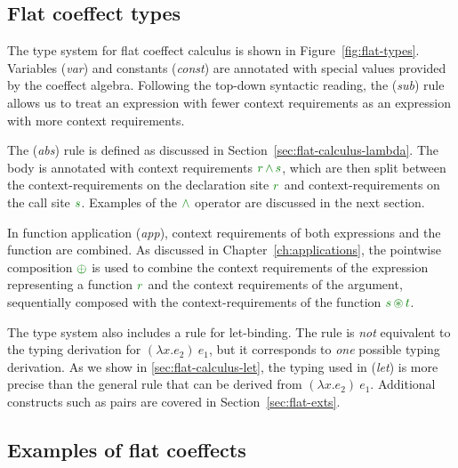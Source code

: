 
\subsection{Flat coeffect types}
\label{sec:flat-calculus-types}

The type system for flat coeffect calculus is shown in Figure~\ref{fig:flat-types}. Variables 
(\emph{var}) and constants (\emph{const}) are annotated with special values provided by the 
coeffect algebra. Following the top-down syntactic reading, the (\emph{sub}) rule allows us to 
treat an expression with fewer context requirements as an expression with more context requirements. 

The (\emph{abs}) rule is defined as discussed in Section~\ref{sec:flat-calculus-lambda}. The
body is annotated with context requirements $\cclrd{r} \,\czip\, \cclrd{s}$, which are then split
between the context-requirements on the declaration site $\cclrd{r}$ and context-requirements on
the call site $\cclrd{s}$. Examples of the $\czip$ operator are discussed in the next section.

In function application (\emph{app}), context requirements of both expressions and the 
function are combined. As discussed in Chapter~\ref{ch:applications}, the pointwise composition
$\cpar$ is used to combine the context requirements of the expression representing a function 
$\cclrd{r}$ and the context requirements of the argument, sequentially composed with the 
context-requirements of the function $\cclrd{s}\, \cseq \,\cclrd{t}$.

The type system also includes a rule for let-binding. The rule is \emph{not} equivalent to the
typing derivation for $(\lambda x.e_2)~e_1$, but it corresponds to \emph{one} possible typing 
derivation. As we show in \ref{sec:flat-calculus-let}, the typing used in (\emph{let}) is more
precise than the general rule that can be derived from $(\lambda x.e_2)~e_1$. Additional 
constructs such as pairs are covered in Section~\ref{sec:flat-exts}.


\subsection{Examples of flat coeffects}
\label{sec:flat-calculus-examples}

